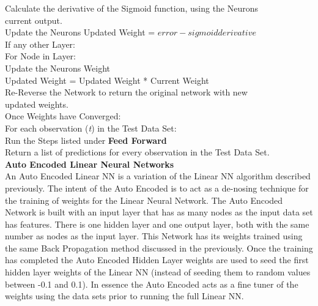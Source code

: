 \documentclass[twoside,11pt]{article}
\newcommand\tab[1][1cm]{\hspace*{#1}}
\begin{document}
\tab \tab \tab \tab Calculate the derivative of the Sigmoid function, using the Neurons\\
\tab \tab \tab \tab current output.\\
\tab \tab \tab \tab Update the Neurons Updated Weight  = $error - sigmoid derivative$\\
\tab \tab \tab \tab If any other Layer:\\
\tab \tab \tab \tab \tab For Node in Layer:\\
\tab \tab \tab \tab \tab \tab Update the Neurons Weight\\
\tab \tab \tab \tab \tab \tab Updated Weight = Updated Weight * Current Weight\\
\tab \tab Re-Reverse the Network to return the original network with new\\ 
\tab \tab updated weights.\\
\tab Once Weights have Converged:\\
\tab For each observation (\textit{t}) in the Test Data Set:\\
\tab \tab Run the Steps listed under \textbf{Feed Forward}\\
\tab Return a list of predictions for every observation in the Test Data Set.\\

\hspace*{10mm} \textbf{Auto Encoded Linear Neural Networks}\\
\hspace*{10mm} An Auto Encoded Linear NN is a variation of the Linear NN algorithm described previously. The intent of the Auto Encoded is to act as a de-nosing technique for the training of weights for the Linear Neural Network. The Auto Encoded Network is built with an input layer that has as many nodes as the input data set has features. There is one hidden layer and one output layer, both with the same number as nodes as the input layer. This Network has its weights trained using the same Back Propagation method discussed in the previously. Once the training has completed the Auto Encoded Hidden Layer weights are used to seed the first hidden layer weights of the Linear NN (instead of seeding them to random values between -0.1 and 0.1). In essence the Auto Encoded acts as a fine tuner of the weights using the data sets prior to running the full Linear NN. \\
\end{document}
